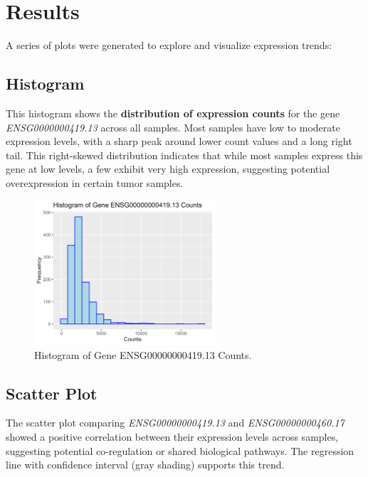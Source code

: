 \documentclass{article}
\begin{document}
\section{Results}
A series of plots were generated to explore and visualize expression trends:

\subsection{Histogram}
This histogram shows the \textbf{distribution of expression counts} for the gene \textit{ENSG0000000419.13} across all samples. Most samples have low to moderate expression levels, with a sharp peak around lower count values and a long right tail. This right-skewed distribution indicates that while most samples express this gene at low levels, a few exhibit very high expression, suggesting potential overexpression in certain tumor samples.

\begin{figure}[h]
    \centering
    \includegraphics[width=0.6\textwidth]{final_project_histogram.png}
    \caption{Histogram of Gene ENSG00000000419.13 Counts.}
    \label{fig:histogram}
\end{figure}

\subsection{Scatter Plot}
The scatter plot comparing \textit{ENSG00000000419.13} and \textit{ENSG00000000460.17} showed a positive correlation between their expression levels across samples, suggesting potential co-regulation or shared biological pathways. The regression line with confidence interval (gray shading) supports this trend.
\end{document}
